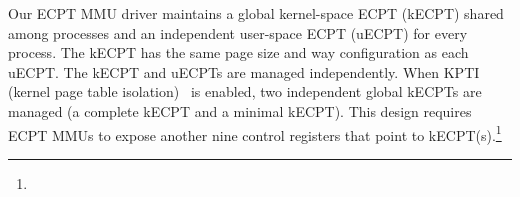 Our ECPT MMU driver maintains a global kernel-space ECPT (kECPT) shared among processes 
	and an independent user-space ECPT (uECPT) for every process.
The kECPT has the same page size and way configuration as each uECPT.
The kECPT and uECPTs are managed independently.
When KPTI (kernel page table isolation)~\cite{linux:kpti} is enabled, 
	two independent global kECPTs are managed
	(a complete kECPT and a minimal kECPT).
This design requires ECPT MMUs to expose another nine control registers that point 
	to kECPT(s).\footnote{
} 
	


